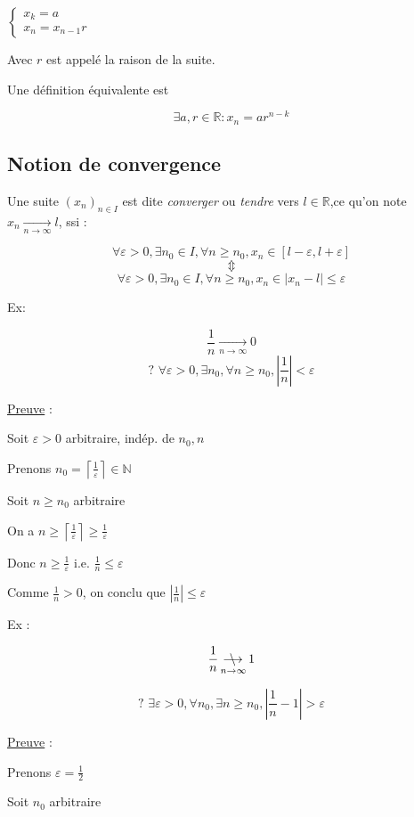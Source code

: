 \documentclass[a4paper,10pt]{article}
\newcommand{\ap}{\rightarrow}
\newcommand{\nap}{ \longrightarrow {\kern-13,5pt{\backslash}}~~}
\newcommand{\R}{\mathbb{R}}
\newcommand{\N}{\mathbb{N}}
\newcommand{\conv}[1]{\mathop{\longrightarrow}\limits_{#1}}
\newcommand{\nconv}[1]{\mathop{\nap}\limits_{#1}}
\newcommand{\abs}[1]{\left\vert #1 \right\vert}
\newcommand{\ceil}[1]{\left\lceil #1 \right\rceil}
\begin{document}
$\begin{cases} x_k = a\\ x_n=x_{n-1} r\end{cases}$

Avec $r$ est appelé la raison de la suite.

Une définition équivalente est

$$\exists a,r \in \R : x_n = a r^{n-k}$$

\subsection{Notion de convergence}

Une suite $(x_n)_{n \in I}$ est dite \textit{converger} ou \textit{tendre} vers $l \in \mathbb{R}$,ce qu'on note $x_n \conv{n \ap \infty} l$, ssi :

$$\forall \varepsilon > 0, \exists n_0 \in I, \forall n \geq n_0, x_n \in \left[ l - \varepsilon , l + \varepsilon \right]$$
$$\Updownarrow$$
$$\forall \varepsilon > 0, \exists n_0 \in I, \forall n \geq n_0, x_n \in \vert x_n - l \vert \leq \varepsilon$$

Ex:

$$\frac{1}{n} \conv{n \ap \infty} 0$$
$$\mbox{? } \forall \varepsilon > 0, \exists n_0, \forall n \geq n_0, \left\vert \frac{1}{n} \right\vert < \varepsilon$$

\underline{Preuve} : 

Soit $\varepsilon > 0$ arbitraire, indép. de $n_0,n$

Prenons $n_0 = \ceil{\frac{1}{\varepsilon}} \in \N$

Soit $n \geq n_0$ arbitraire

On a $n \geq \ceil{\frac{1}{\varepsilon}} \geq \frac{1}{\varepsilon}$

Donc $n \geq \frac{1}{\varepsilon}$ i.e. $\frac{1}{n} \leq \varepsilon$

Comme $\frac{1}{n} > 0$, on conclu que $\left\vert \frac{1}{n} \right\vert \leq \varepsilon$ 


Ex :

$$\frac{1}{n} \nconv{n \ap \infty} 1$$

$$\mbox{? } \exists \varepsilon > 0, \forall n_0, \exists n \geq n_0, \abs{\frac{1}{n} -1} > \varepsilon$$

\underline{Preuve} :

Prenons $\varepsilon = \frac{1}{2}$

Soit $n_0$ arbitraire
\end{document}
